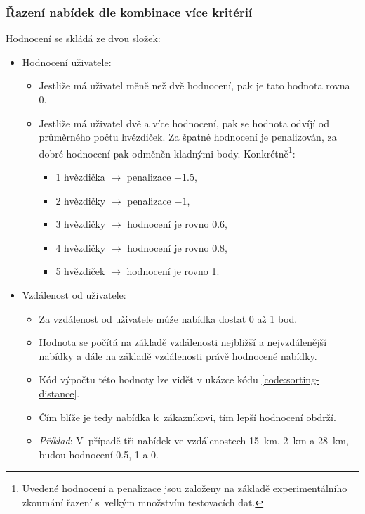 \subsubsection{Řazení nabídek dle kombinace více kritérií}
Hodnocení se skládá ze dvou složek:
\begin{itemize}
	\item Hodnocení uživatele:
        \begin{itemize}
            \item Jestliže má uživatel měně než dvě hodnocení, pak je tato hodnota rovna 0.
            \item Jestliže má uživatel dvě a více hodnocení, pak se hodnota odvíjí od průměrného počtu hvězdiček. Za špatné hodnocení je penalizován, za dobré hodnocení pak odměněn kladnými body. Konkrétně\footnote{Uvedené hodnocení a penalizace jsou založeny na základě experimentálního zkoumání řazení s~velkým množstvím testovacích dat.}:
            \begin{itemize}
                \item 1 hvězdička $\rightarrow$ penalizace $-1.5$,
                \item 2 hvězdičky $\rightarrow$ penalizace $-1$,
                \item 3 hvězdičky $\rightarrow$ hodnocení je rovno 0.6,
                \item 4 hvězdičky $\rightarrow$ hodnocení je rovno 0.8,
                \item 5 hvězdiček $\rightarrow$ hodnocení je rovno 1.
            \end{itemize}
        \end{itemize}
	\item Vzdálenost od uživatele:
        \begin{itemize}
            \item Za vzdálenost od uživatele může nabídka dostat 0 až 1 bod.
            \item Hodnota se počítá na základě vzdálenosti nejbližší a nejvzdálenější nabídky a dále na základě vzdálenosti právě hodnocené nabídky.
            \item Kód výpočtu této hodnoty lze vidět v ukázce kódu \ref{code:sorting-distance}.
            \item Čím blíže je tedy nabídka k~zákazníkovi, tím lepší hodnocení obdrží.
            \item \textit{Příklad}: V~případě tři nabídek ve vzdálenostech 15~km, 2~km a 28~km, budou hodnocení 0.5, 1 a 0.
        \end{itemize}
\end{itemize}


